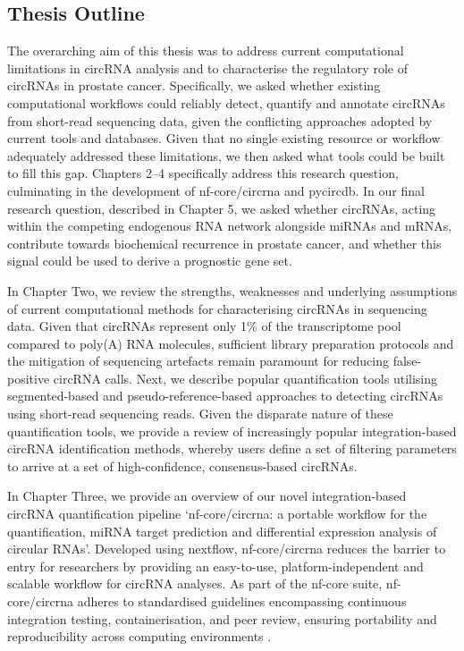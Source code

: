 \subsection{Thesis Outline}
The overarching aim of this thesis was to address current computational limitations in circRNA analysis and to characterise the regulatory role of circRNAs in prostate cancer. Specifically, we asked whether existing computational workflows could reliably detect, quantify and annotate circRNAs from short-read sequencing data, given the conflicting approaches adopted by current tools and databases. Given that no single existing resource or workflow adequately addressed these limitations, we then asked what tools could be built to fill this gap. Chapters 2–4 specifically address this research question, culminating in the development of nf-core/circrna and pycircdb. In our final research question, described in Chapter 5, we asked whether circRNAs, acting within the competing endogenous RNA network alongside miRNAs and mRNAs, contribute towards biochemical recurrence in prostate cancer, and whether this signal could be used to derive a prognostic gene set. 

In Chapter Two, we review the strengths, weaknesses and underlying assumptions of current computational methods for characterising circRNAs in sequencing data. Given that circRNAs represent only 1\% of the transcriptome pool compared to poly(A) RNA molecules, sufficient library preparation protocols and the mitigation of sequencing artefacts remain paramount for reducing false-positive circRNA calls. Next, we describe popular quantification tools utilising segmented-based and pseudo-reference-based approaches to detecting circRNAs using short-read sequencing reads. Given the disparate nature of these quantification tools, we provide a review of increasingly popular integration-based circRNA identification methods, whereby users define a set of filtering parameters to arrive at a set of high-confidence, consensus-based circRNAs.

In Chapter Three, we provide an overview of our novel integration-based circRNA quantification pipeline `nf-core/circrna: a portable workflow for the quantification, miRNA target prediction and differential expression analysis of circular RNAs'. Developed using nextflow, nf-core/circrna reduces the barrier to entry for researchers by providing an easy-to-use, platform-independent and scalable workflow for circRNA analyses. As part of the nf-core suite, nf-core/circrna adheres to standardised guidelines encompassing continuous integration testing, containerisation, and peer review, ensuring portability and reproducibility across computing environments \cite{Ewels2020Mar}.

